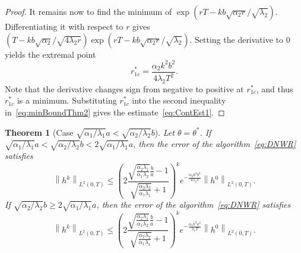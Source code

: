 \documentclass[reqno]{amsart}
\newtheorem{theorem}{Theorem}
\newcommand{\norm}[1]{\left\lVert#1\right\rVert}
\begin{document}
\begin{proof}
It remains now to find the minimum of $\exp(rT - kb\sqrt{\alpha_2r}/\sqrt{\lambda_2})$. Differentiating it with respect to $r$ gives $(T - k b\sqrt{\alpha_2}/\sqrt{4\lambda_2 r}) \exp(rT - kb \sqrt{\alpha_2 r}/\sqrt{\lambda_2})$. Setting the derivative to 0 yields the extremal point
\begin{equation}\label{eq:ropt-case1}
r^*_{1c} = \frac{\alpha_2k^2 b^2}{4\lambda_2T^2}.
\end{equation}
Note that the derivative changes sign from negative to positive at $r^*_{1c}$, and thus $r^*_{1c}$ is a minimum. Substituting $r^*_{1c}$ into the second inequality in~\eqref{eq:minBoundThm2} gives the estimate~\eqref{eq:ContEst1}.
\end{proof}


\begin{theorem}[Case $\sqrt{\alpha_1/\lambda_1} a < \sqrt{\alpha_2/\lambda_2} b$]\label{thm:cont-case2}
Let $\theta = \theta^*$. If $\sqrt{\alpha_1/\lambda_1} a < \sqrt{\alpha_2/\lambda_2} b < 2\sqrt{\alpha_1/\lambda_1} a$, then the error of the algorithm~\eqref{eq:DNWR} satisfies 
\begin{equation}\label{eq:estimate-case2-1}
\norm{h^k}_{L^2(0, T)} \leq \left(2\frac{\sqrt{\frac{\alpha_2 \lambda_1}{\alpha_1\lambda_2}}\frac{b}{a} - 1}{\sqrt{\frac{\alpha_2 \lambda_2}{\alpha_1\lambda_1}}+1} \right)^k e^{-\frac{\alpha_2 k^2b^2}{4\lambda_2 T}} \norm{h^0}_{L^2(0, T)}.
\end{equation}
If $\sqrt{\alpha_2/\lambda_2} b \geq 2\sqrt{\alpha_1/\lambda_1} a$, then the error of the algorithm~\eqref{eq:DNWR} satisfies 
\begin{equation}\label{eq:estimate-case2-2}
\norm{h^k}_{L^2(0, T)} \leq \left(2\frac{\sqrt{\frac{\alpha_2 \lambda_1}{\alpha_1\lambda_2}}\frac{b}{a} - 1}{\sqrt{\frac{\alpha_2 \lambda_2}{\alpha_1\lambda_1}}+1} \right)^k e^{-\frac{\alpha_1 k^2a^2}{\lambda_1 T}} \norm{h^0}_{L^2(0, T)}.
\end{equation}
\end{theorem}
\end{document}
